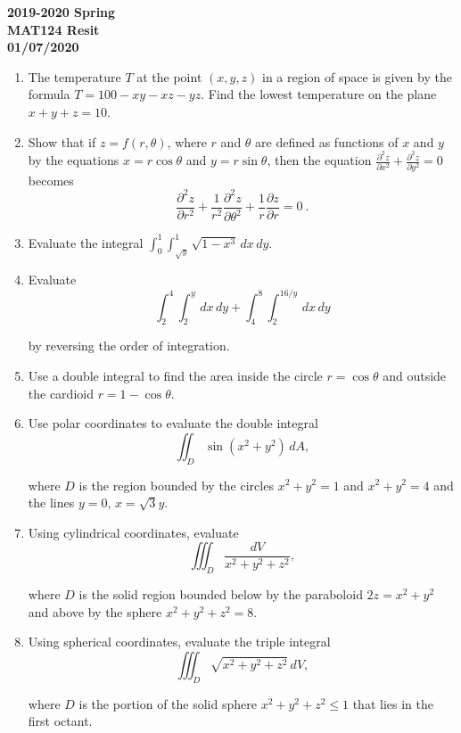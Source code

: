 \documentclass[a4paper, 12pt]{article}
\begin{document}
\pagestyle{empty}

\begin{center}
\textbf{2019-2020 Spring\\MAT124 Resit\\01/07/2020}
\end{center}

\begin{enumerate}[leftmargin=*,label=\textbf{\arabic*.}]
\item The temperature $T$ at the point $(x,y,z)$ in a region of space is given by the formula $T=100-xy-xz-yz$. Find the lowest temperature on the plane $x+y+z=10$.

\item Show that if $z=f(r, \theta)$, where $r$ and $\theta$ are defined as functions of $x$ and $y$ by the equations $x=r\cos\theta$ and $y=r\sin\theta$, then the equation $\displaystyle\frac{\partial^2z}{\partial x^2}+\frac{\partial ^2z}{\partial y^2} = 0$ becomes
\[\frac{\partial^2z}{\partial r^2}+\frac{1}{r^2}\frac{\partial^2z}{\partial\theta^2}+\frac{1}{r}\frac{\partial z}{\partial r}=0\:.\]

\item Evaluate the integral $\displaystyle \int_0^1\int_{\sqrt y}^1 \sqrt{1-x^3}\,dx\,dy$.

\item Evaluate
\[\int_2^4\int_2^y\,dx\,dy + \int_4^8\int_2^{16/y}\,dx\,dy\]

by reversing the order of integration.

\item Use a double integral to find the area inside the circle $r=\cos\theta$ and outside the cardioid $r=1-\cos\theta$.

\item Use polar coordinates to evaluate the double integral
\[\iint_D\sin\left(x^2+y^2\right)\,dA,\]

where $D$ is the region bounded by the circles $x^2+y^2=1$ and $x^2+y^2=4$ and the lines $y=0$, $x=\sqrt3 y$.

\item Using cylindrical coordinates, evaluate
\[\iiint_D\frac{dV}{x^2+y^2+z^2},\]

where $D$ is the solid region bounded below by the paraboloid $2z=x^2+y^2$ and above by the sphere $x^2+y^2+z^2=8$.

\item Using spherical coordinates, evaluate the triple integral
\[\iiint_D\sqrt{x^2+y^2+z^2}\,dV,\]

where $D$ is the portion of the solid sphere $x^2+y^2+z^2\leq1$ that lies in the first octant.
\end{enumerate}
\end{document}
